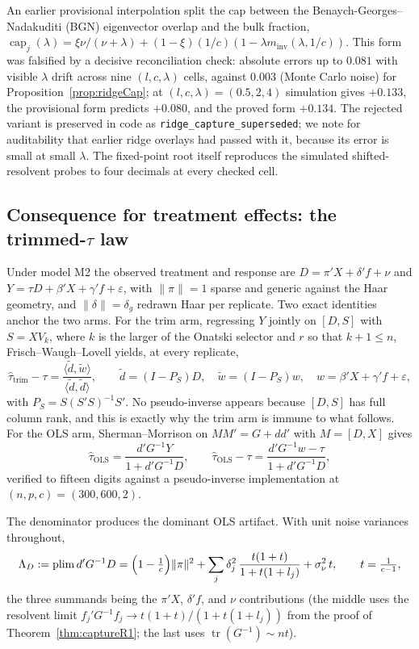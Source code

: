 \begin{remark}
An earlier provisional interpolation split the cap between the Benaych-Georges--Nadakuditi (BGN) eigenvector overlap \citep{benaychgeorges2011eigenvalues} and the bulk fraction, $\operatorname{cap}_j(\lambda)=\xi\nu/(\nu+\lambda)+(1-\xi)(1/c)(1-\lambda m_{\mathrm{inv}}(\lambda,1/c))$. This form was falsified by a decisive reconciliation check: absolute errors up to $0.081$ with visible $\lambda$ drift across nine $(l,c,\lambda)$ cells, against $0.003$ (Monte Carlo noise) for Proposition~\ref{prop:ridgeCap}; at $(l,c,\lambda)=(0.5,2,4)$ simulation gives $+0.133$, the provisional form predicts $+0.080$, and the proved form $+0.134$. The rejected variant is preserved in code as \texttt{ridge\_capture\_superseded}; we note for auditability that earlier ridge overlays had passed with it, because its error is small at small $\lambda$. The fixed-point root itself reproduces the simulated shifted-resolvent probes to four decimals at every checked cell.
\end{remark}

\subsection{Consequence for treatment effects: the trimmed-$\tau$ law}\label{subsec:trimtau}

Under model M2 the observed treatment and response are $D=\pi'X+\delta'f+\nu$ and $Y=\tau D+\beta'X+\gamma'f+\varepsilon$, with $\|\pi\|=1$ sparse and generic against the Haar geometry, and $\|\delta\|=\delta_g$ redrawn Haar per replicate. Two exact identities anchor the two arms. For the trim arm, regressing $Y$ jointly on $[D,S]$ with $S=XV_k$, where $k$ is the larger of the Onatski selector and $r$ so that $k+1\le n$, Frisch--Waugh--Lovell yields, at every replicate,
\[
\hat\tau_{\mathrm{trim}}-\tau=\frac{\langle\tilde d,\tilde w\rangle}{\langle\tilde d,\tilde d\rangle},
\qquad \tilde d=(I-P_S)D,\quad \tilde w=(I-P_S)w,\quad w=\beta'X+\gamma'f+\varepsilon,
\]
with $P_S=S(S'S)^{-1}S'$. No pseudo-inverse appears because $[D,S]$ has full column rank, and this is exactly why the trim arm is immune to what follows. For the OLS arm, Sherman--Morrison on $MM'=G+dd'$ with $M=[D,X]$ gives
\[
\hat\tau_{\mathrm{OLS}}=\frac{d'G^{-1}Y}{1+d'G^{-1}D},
\qquad
\hat\tau_{\mathrm{OLS}}-\tau=\frac{d'G^{-1}w-\tau}{1+d'G^{-1}D},
\]
verified to fifteen digits against a pseudo-inverse implementation at $(n,p,c)=(300,600,2)$.

The denominator produces the dominant OLS artifact. With unit noise variances throughout,
\[
\Lambda_D:=\operatorname{plim} d'G^{-1}D
=\Bigl(1-\tfrac1c\Bigr)\|\pi\|^2
+\sum_j\delta_j^2\,\frac{t(1+t)}{1+t(1+l_j)}
+\sigma_\nu^2\,t,
\qquad t=\tfrac1{c-1},
\]
the three summands being the $\pi'X$, $\delta'f$, and $\nu$ contributions (the middle uses the resolvent limit $f_j'G^{-1}f_j\to t(1+t)/(1+t(1+l_j))$ from the proof of Theorem~\ref{thm:captureR1}; the last uses $\operatorname{tr}(G^{-1})\sim nt$).


